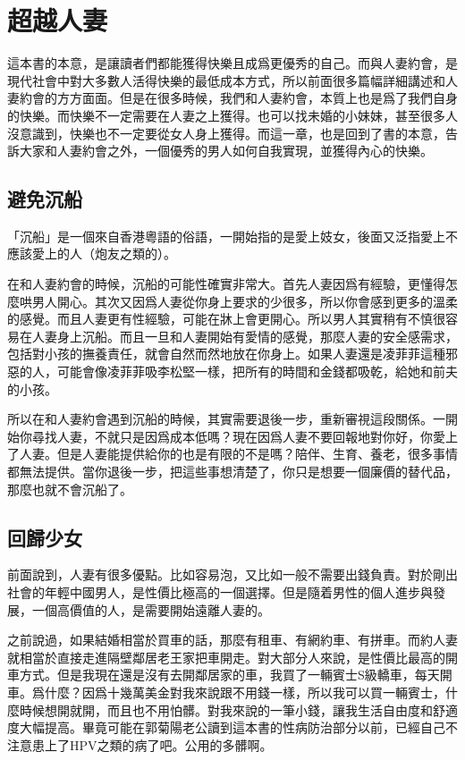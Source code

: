 \chapter{超越人妻}

這本書的本意，是讓讀者們都能獲得快樂且成爲更優秀的自己。而與人妻約會，是現代社會中對大多數人活得快樂的最低成本方式，所以前面很多篇幅詳細講述和人妻約會的方方面面。但是在很多時候，我們和人妻約會，本質上也是爲了我們自身的快樂。而快樂不一定需要在人妻之上獲得。也可以找未婚的小妹妹，甚至很多人沒意識到，快樂也不一定要從女人身上獲得。而這一章，也是回到了書的本意，告訴大家和人妻約會之外，一個優秀的男人如何自我實現，並獲得內心的快樂。

\section{避免沉船}

「沉船」是一個來自香港粵語的俗語，一開始指的是愛上妓女，後面又泛指愛上不應該愛上的人（炮友之類的）。

在和人妻約會的時候，沉船的可能性確實非常大。首先人妻因爲有經驗，更懂得怎麼哄男人開心。其次又因爲人妻從你身上要求的少很多，所以你會感到更多的溫柔的感覺。而且人妻更有性經驗，可能在牀上會更開心。所以男人其實稍有不慎很容易在人妻身上沉船。而且一旦和人妻開始有愛情的感覺，那麼人妻的安全感需求，包括對小孩的撫養責任，就會自然而然地放在你身上。如果人妻還是凌菲菲這種邪惡的人，可能會像凌菲菲吸李松堅一樣，把所有的時間和金錢都吸乾，給她和前夫的小孩。

所以在和人妻約會遇到沉船的時候，其實需要退後一步，重新審視這段關係。一開始你尋找人妻，不就只是因爲成本低嗎？現在因爲人妻不要回報地對你好，你愛上了人妻。但是人妻能提供給你的也是有限的不是嗎？陪伴、生育、養老，很多事情都無法提供。當你退後一步，把這些事想清楚了，你只是想要一個廉價的替代品，那麼也就不會沉船了。

\section{回歸少女}

前面說到，人妻有很多優點。比如容易泡，又比如一般不需要出錢負責。對於剛出社會的年輕中國男人，是性價比極高的一個選擇。但是隨着男性的個人進步與發展，一個高價值的人，是需要開始遠離人妻的。

之前說過，如果結婚相當於買車的話，那麼有租車、有網約車、有拼車。而約人妻就相當於直接走進隔壁鄰居老王家把車開走。對大部分人來說，是性價比最高的開車方式。但是我現在還是沒有去開鄰居家的車，我買了一輛賓士S級轎車，每天開車。爲什麼？因爲十幾萬美金對我來說跟不用錢一樣，所以我可以買一輛賓士，什麼時候想開就開，而且也不用怕髒。對我來說的一筆小錢，讓我生活自由度和舒適度大幅提高。畢竟可能在郭菊陽老公讀到這本書的性病防治部分以前，已經自己不注意患上了HPV之類的病了吧。公用的多髒啊。

